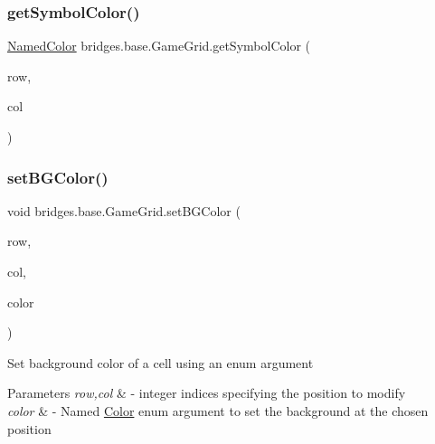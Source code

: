 \subsubsection{\texorpdfstring{get\+Symbol\+Color()}{getSymbolColor()}}
{\footnotesize\ttfamily \hyperlink{enumbridges_1_1base_1_1_named_color}{Named\+Color} bridges.\+base.\+Game\+Grid.\+get\+Symbol\+Color (\begin{DoxyParamCaption}\item[{Integer}]{row,  }\item[{Integer}]{col }\end{DoxyParamCaption})}

\mbox{\label{classbridges_1_1base_1_1_game_grid_a72d7d5b03b78fdc4110cee955727a523}} 
\subsubsection{\texorpdfstring{set\+B\+G\+Color()}{setBGColor()}\hspace{0.1cm}{\footnotesize\ttfamily [1/2]}}
{\footnotesize\ttfamily void bridges.\+base.\+Game\+Grid.\+set\+B\+G\+Color (\begin{DoxyParamCaption}\item[{Integer}]{row,  }\item[{Integer}]{col,  }\item[{\hyperlink{enumbridges_1_1base_1_1_named_color}{Named\+Color}}]{color }\end{DoxyParamCaption})}

Set background color of a cell using an enum argument


\begin{DoxyParams}{Parameters}
{\em row,col} & -\/ integer indices specifying the position to modify \\
\hline
{\em color} & -\/ Named \hyperlink{classbridges_1_1base_1_1_color}{Color} enum argument to set the background at the chosen position \\
\hline
\end{DoxyParams}
\mbox{\label{classbridges_1_1base_1_1_game_grid_ad655bef3f2c24cc19f222b86b5d31373}} 
